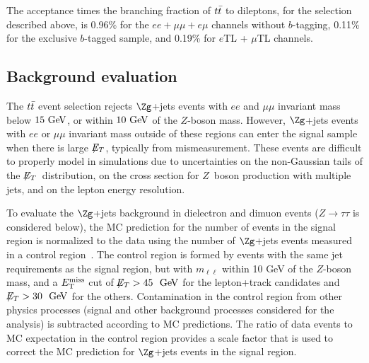 The acceptance times the branching fraction of $t\bar{t}$ to
dileptons, for the selection described above, is 0.96\% for the $ee
+ \mu\mu +e\mu$ channels without $b$-tagging, 0.11\% for the
exclusive $b$-tagged sample, and 0.19\% for $e$TL + $\mu$TL
channels.


\subsection{Background evaluation}
\label{s:backgrounds}

The $t\bar{t}$ event selection rejects $\Zg$+jets
events with $ee$ and $\mu\mu$ invariant mass below $15 \GeV$, or within $10 \GeV$ of the $Z$-boson mass. However, $\Zg$+jets events with $ee$ or $\mu\mu$  invariant mass outside of these regions can enter the signal sample when there is large $\not\!\!{E_{T}}$, typically from mismeasurement.
These events are difficult to properly model in simulations
due to uncertainties on the non-Gaussian tails of the $\not\!\!{E_{T}}$\ distribution,
on the cross section for $Z$~boson production with multiple jets, and on the
lepton energy resolution.

To evaluate the $\Zg$+jets background in dielectron and dimuon events
($Z \to \tau\tau$ is considered below), the MC prediction for the number of events in the signal region is normalized to the data using the number of
$\Zg$+jets events measured in a control region~\cite{ATL-CONF-2011-034}.
The control region is formed by
events with the same jet requirements as the signal region, but with
 $m_{\ell \ell}$ within 10 GeV of the $Z$-boson mass, and a $E_{\mathrm{T}}^{\mathrm{miss}}$ cut of
$\met>45~\GeV$ for the lepton+track candidates and $\met>30~\GeV$
for the others. Contamination in the control region from other
physics processes (signal and other background processes considered
for the analysis) is subtracted according to MC predictions.
The ratio of data events to MC expectation in the control region
provides a scale factor that is used to correct the MC prediction
for $\Zg$+jets events in the signal region.


